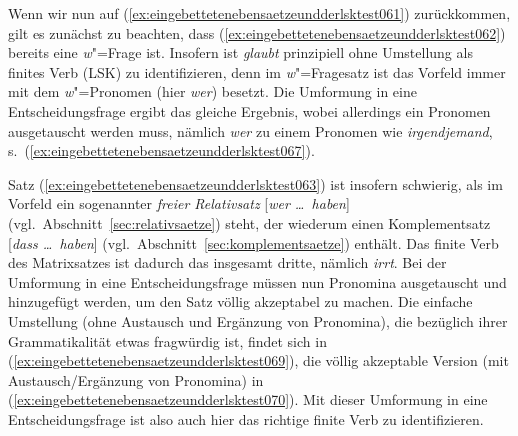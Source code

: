 \begin{exe}
\end{exe}

Wenn wir nun auf (\ref{ex:eingebettetenebensaetzeundderlsktest061}) zurückkommen, gilt es zunächst zu beachten, dass (\ref{ex:eingebettetenebensaetzeundderlsktest062}) bereits eine \textit{w}"=Frage ist.
Insofern ist \textit{glaubt} prinzipiell ohne Umstellung als finites Verb (LSK) zu identifizieren, denn im \textit{w}"=Fragesatz ist das Vorfeld immer mit dem \textit{w}"=Pro\-no\-men (hier \textit{wer}) besetzt.
Die Umformung in eine Entscheidungsfrage ergibt das gleiche Ergebnis, wobei allerdings ein Pronomen ausgetauscht werden muss, nämlich \textit{wer} zu einem Pronomen wie \textit{irgendjemand}, s.\ (\ref{ex:eingebettetenebensaetzeundderlsktest067}).

\begin{exe}
\end{exe}

Satz (\ref{ex:eingebettetenebensaetzeundderlsktest063}) ist insofern schwierig, als im Vorfeld ein sogenannter \textit{freier Relativsatz} [\textit{wer \ldots\ haben}] (vgl.\ Abschnitt~\ref{sec:relativsaetze}) steht, der wiederum einen Komplementsatz [\textit{dass \ldots\ haben}] (vgl.\ Abschnitt~\ref{sec:komplementsaetze}) enthält.
Das finite Verb des Matrixsatzes ist dadurch das insgesamt dritte, nämlich \textit{irrt}.
Bei der Umformung in eine Entscheidungsfrage müssen nun Pronomina ausgetauscht und hinzugefügt werden, um den Satz völlig akzeptabel zu machen.
Die einfache Umstellung (ohne Austausch und Ergänzung von Pronomina), die bezüglich ihrer Grammatikalität etwas fragwürdig ist, findet sich in (\ref{ex:eingebettetenebensaetzeundderlsktest069}), die völlig akzeptable Version (mit Austausch\slash Ergänzung von Pronomina) in (\ref{ex:eingebettetenebensaetzeundderlsktest070}).
Mit dieser Umformung in eine Entscheidungsfrage ist also auch hier das richtige finite Verb zu identifizieren.

\begin{exe}
  \ex\label{ex:eingebettetenebensaetzeundderlsktest068}
  \begin{xlist}
  \end{xlist}
\end{exe}

